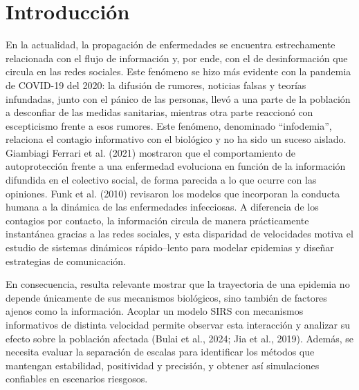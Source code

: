 \section{Introducción}

En la actualidad, la propagación de enfermedades se encuentra estrechamente relacionada con el flujo de información y, por ende, con el de desinformación que circula en las redes sociales. Este fenómeno se hizo más evidente con la pandemia de COVID-19 del 2020: la difusión de rumores, noticias falsas y teorías infundadas, junto con el pánico de las personas, llevó a una parte de la población a desconfiar de las medidas sanitarias, mientras otra parte reaccionó con escepticismo frente a esos rumores. Este fenómeno, denominado ``infodemia'', relaciona el contagio informativo con el biológico y no ha sido un suceso aislado. Giambiagi Ferrari et al. (2021) mostraron que el comportamiento de autoprotección frente a una enfermedad evoluciona en función de la información difundida en el colectivo social, de forma parecida a lo que ocurre con las opiniones. Funk et al. (2010) revisaron los modelos que incorporan la conducta humana a la dinámica de las enfermedades infecciosas. A diferencia de los contagios por contacto, la información circula de manera prácticamente instantánea gracias a las redes sociales, y esta disparidad de velocidades motiva el estudio de sistemas dinámicos rápido--lento para modelar epidemias y diseñar estrategias de comunicación.

En consecuencia, resulta relevante mostrar que la trayectoria de una epidemia no depende únicamente de sus mecanismos biológicos, sino también de factores ajenos como la información. Acoplar un modelo SIRS con mecanismos informativos de distinta velocidad permite observar esta interacción y analizar su efecto sobre la población afectada (Bulai et al., 2024; Jia et al., 2019). Además, se necesita evaluar la separación de escalas para identificar los métodos que mantengan estabilidad, positividad y precisión, y obtener así simulaciones confiables en escenarios riesgosos.

